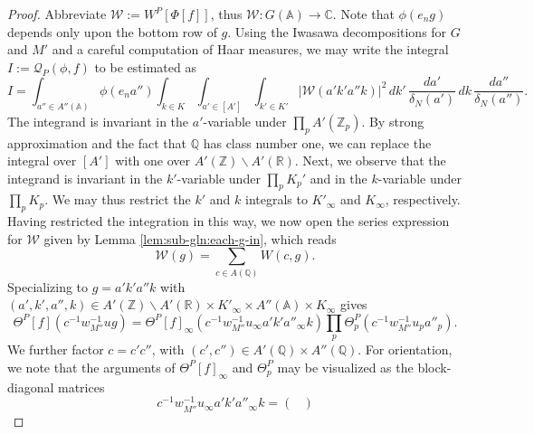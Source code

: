 \begin{proof}
  Abbreviate $\mathcal{W} := W^P[\Phi[f]]$, thus $\mathcal{W} : G(\mathbb{A}) \rightarrow \mathbb{C}$.  Note that $\phi(e_n g)$ depends only upon the bottom row of $g$.  Using the Iwasawa decompositions for $G$ and $M'$ and a careful computation of Haar measures, we may write the integral $I := \mathcal{Q}_P(\phi,f)$ to be estimated as
  \begin{equation*}
    I = \int_{a'' \in A''(\mathbb{A})}
    \phi(e_n a'')
    \int_{k \in K}
    \int_{a' \in [A']}
    \int_{k' \in K'}
    |\mathcal{W}(a' k' a'' k)|^2
    \, d k' \, \frac{d a'}{\delta_N(a')}
    \, d k \, \frac{d a''}{\delta_N(a'')}.
  \end{equation*}
  The integrand is invariant in the $a'$-variable under $\prod_p A'(\mathbb{Z}_p)$.  By strong approximation and the fact that $\mathbb{Q}$ has class number one, we can replace the integral over $[A']$ with one over $A'(\mathbb{Z}) \backslash A'(\mathbb{R})$.  Next, we observe that the integrand is invariant in the $k'$-variable under $\prod_p K_p'$ and in the $k$-variable under $\prod_p K_p$.  We may thus restrict the $k'$ and $k$ integrals to $K'_\infty$ and $K_\infty$, respectively.  Having restricted the integration in this way, we now open the series expression for $\mathcal{W}$ given by Lemma \ref{lem:sub-gln:each-g-in}, which reads
  \begin{equation*}
    \mathcal{W}(g) = \sum_{c \in A(\mathbb{Q})} W(c,g).
  \end{equation*}
  Specializing to $g = a' k' a'' k$ with $(a',k',a'',k) \in A'(\mathbb{Z}) \backslash A'(\mathbb{R}) \times K'_\infty \times A''(\mathbb{A}) \times K_\infty$ gives
  \begin{equation*}
    \Theta^P[f](c^{-1} w_{M''}^{-1} u g)
    =
    \Theta^P[f]_\infty(c^{-1} w_{M''}^{-1} u_\infty a' k' a''_\infty k)
    \prod_{p}
    \Theta^P_p(c^{-1} w_{M''}^{-1} u_p a''_p).
  \end{equation*}
  We further factor $c = c' c''$, with $(c', c'') \in A'(\mathbb{Q}) \times A''(\mathbb{Q})$.  For orientation, we note that the arguments of $\Theta^P[f]_\infty$ and $\Theta_p^P$ may be visualized as the block-diagonal matrices
  \begin{equation*}
    c^{-1} w_{M''}^{-1} u_\infty a' k' a''_\infty k
    =
    \begin{pmatrix}

\end{pmatrix}
\end{equation*}
\end{proof}
